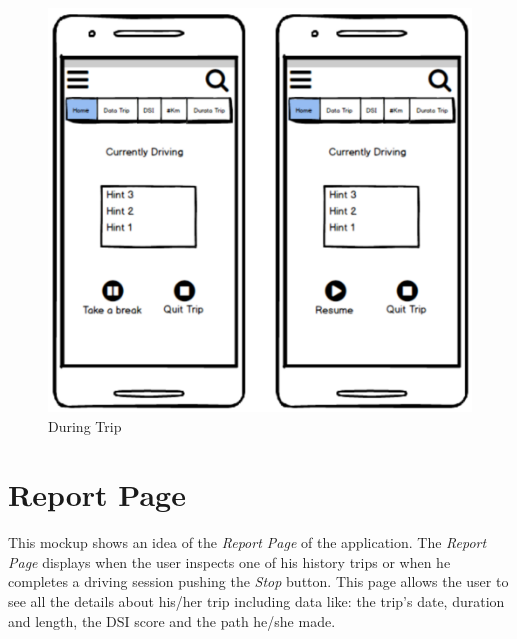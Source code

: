 \begin{figure}[htbp]
	\centering
	\begin{minipage}[b]{0.9\textwidth}
		\includegraphics[width=\textwidth]{cpt/img/DuringTrip.png}
		\caption{During Trip}
	\end{minipage}
\end{figure}

\clearpage
\section{Report Page}
This mockup shows an idea of the \textit{Report Page} of the application. The \textit{Report Page} displays when the user inspects one of his history trips or when he completes a driving session pushing the \textit{Stop} button. This page allows the user to see all the details about his/her trip including data like: the trip's date, duration and length, the DSI score and the path he/she made.\\

